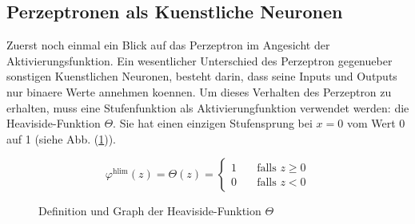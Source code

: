 \subsection{Perzeptronen als Kuenstliche Neuronen}
Zuerst noch einmal ein Blick auf das Perzeptron im Angesicht der Aktivierungsfunktion.
Ein wesentlicher Unterschied des Perzeptron gegenueber sonstigen Kuenstlichen
Neuronen, besteht darin, dass seine Inputs und Outputs nur binaere Werte
annehmen koennen. Um dieses Verhalten des Perzeptron zu erhalten,
muss eine Stufenfunktion als Aktivierungfunktion verwendet werden: die Heaviside-Funktion $\Theta$.
Sie hat einen einzigen Stufensprung bei $x=0$ vom Wert 0 auf 1 (siehe Abb. (\ref{fig:heaviside})).
\\
\begin{figure}[h!]
  \begin{minipage}[h!]{0.5\textwidth}
    \begin{equation*}
      \varphi^{\text{hlim}}(z) = \Theta(z) =
      \begin{cases}
        1 & \quad \text{falls } z \geq 0\\
        0 & \quad \text{falls } z < 0
      \end{cases}
    \end{equation*}
  \end{minipage}
  \begin{minipage}[h!]{0.5\textwidth}
    \centering
  \end{minipage}
  \caption{Definition und Graph der Heaviside-Funktion $\Theta$}
  \label{fig:heaviside}
\end{figure}


